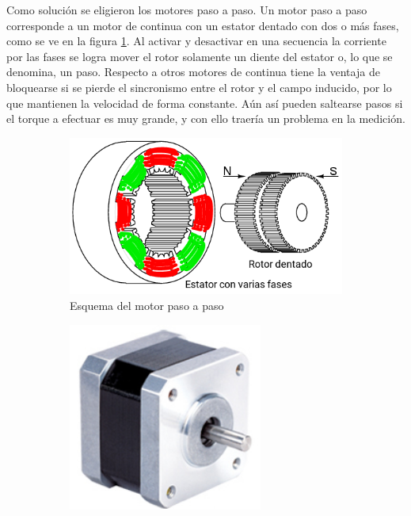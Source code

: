Como solución se eligieron los motores paso a paso. Un motor paso a paso corresponde a un motor de continua con un estator dentado con dos o más fases, como se ve en la figura \ref{fig:stepper_inner}. Al activar y desactivar en una secuencia la corriente por las fases se logra mover el rotor solamente un diente del estator o, lo que se denomina, un paso. Respecto a otros motores de continua tiene la ventaja de bloquearse si se pierde el sincronismo entre el rotor y el campo inducido, por lo que mantienen la velocidad de forma constante. Aún así pueden saltearse pasos si el torque a efectuar es muy grande, y con ello traería un problema en la medición. 

\begin{figure}[H]
    \begin{subfigure}[b]{0.33\textwidth}
        \centering
        \includegraphics[width=\textwidth]{fig/motor/diagrama_stepper}
        \caption{Esquema del motor paso a paso}
        \label{fig:stepper_inner}
    \end{subfigure}
    \begin{subfigure}[b]{0.33\textwidth}
        \centering
        \includegraphics[width=0.7\textwidth]{fig/motor/nema17}

\end{subfigure}
\end{figure}
